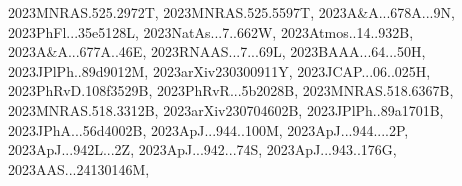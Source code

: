 \documentclass[12pt]{article}
\begin{document}
\begin{description}
{2023MNRAS.525.2972T,%
2023MNRAS.525.5597T,%
2023A&A...678A...9N,%
2023PhFl...35e5128L,%
2023NatAs...7..662W,%
2023Atmos..14..932B,%
2023A&A...677A..46E,%
2023RNAAS...7...69L,%
2023BAAA...64...50H,%
2023JPlPh..89d9012M,%
2023arXiv230300911Y,%
2023JCAP...06..025H,%
2023PhRvD.108f3529B,%
2023PhRvR...5b2028B,%
2023MNRAS.518.6367B,%
2023MNRAS.518.3312B,%
2023arXiv230704602B,%
2023JPlPh..89a1701B,%
2023JPhA...56d4002B,%
2023ApJ...944..100M,%
2023ApJ...944....2P,%
2023ApJ...942L...2Z,%
2023ApJ...942...74S,%
2023ApJ...943..176G,%
2023AAS...24130146M,%
}
\end{description}
\end{document}

